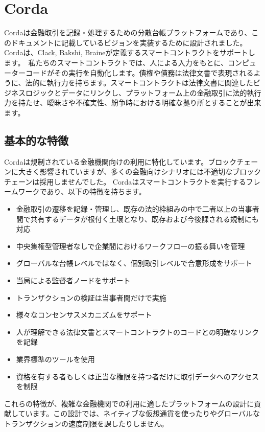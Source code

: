 \documentclass{article}
\begin{document}
\section{Corda}
Cordaは金融取引を記録・処理するための分散台帳プラットフォームであり、このドキュメントに記載しているビジョンを実装するために設計されました。
Cordaは、Clack, Bakshi, Braineが定義するスマートコントラクトをサポートします。\cite{SCT}　私たちのスマートコントラクトでは、人による入力をもとに、コンピューターコードがその実行を自動化します。債権や債務は法律文書で表現されるように、法的に執行力を持ちます。スマートコントラクトは法律文書に関連したビジネスロジックとデータにリンクし、プラットフォーム上の金融取引に法的執行力を持たせ、曖昧さや不確実性、紛争時における明確な拠り所とすることが出来ます。
\subsection{基本的な特徴}
Cordaは規制されている金融機関向けの利用に特化しています。ブロックチェーンに大きく影響されていますが、多くの金融向けシナリオには不適切なブロックチェーンは採用しませんでした。
Cordaはスマートコントラクトを実行するフレームワークであり、以下の特徴を持ちます。
\begin{itemize}
    	\item{金融取引の遷移を記録・管理し、既存の法的枠組みの中で二者以上の当事者間で共有するデータが根付く土壌となり、既存および今後課される規制にも対応}
	\item{中央集権型管理者なしで企業間におけるワークフローの振る舞いを管理}
	\item{グローバルな台帳レベルではなく、個別取引レベルで合意形成をサポート}
	\item{当局による監督者ノードをサポート}
	\item{トランザクションの検証は当事者間だけで実施}
	\item{様々なコンセンサスメカニズムをサポート}
	\item{人が理解できる法律文書とスマートコントラクトのコードとの明確なリンクを記録}
	\item{業界標準のツールを使用}
	\item{資格を有する者もしくは正当な権限を持つ者だけに取引データへのアクセスを制限}
\end{itemize}
これらの特徴が、複雑な金融機関での利用に適したプラットフォームの設計に貢献しています。この設計では、ネイティブな仮想通貨を使ったりやグローバルなトランザクションの速度制限を課したりしません。
\end{document}
